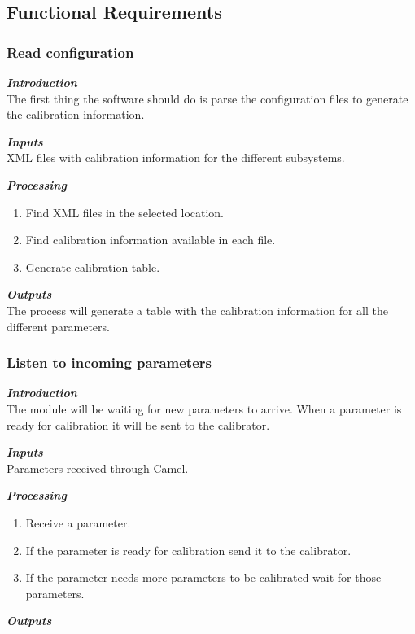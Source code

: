 \pagebreak

\subsection{Functional Requirements}

\subsubsection{Read configuration}

\textbf{\emph{Introduction}}\\
The first thing the software should do is parse the configuration files to generate the calibration information.

\textbf{\emph{Inputs}}\\

XML files with calibration information for the different subsystems.

\textbf{\emph{Processing}}\\
\begin{enumerate}
\item Find XML files in the selected location.
\item Find calibration information available in each file.
\item Generate calibration table.
\end{enumerate}

\textbf{\emph{Outputs}}\\

The process will generate a table with the calibration information for all the different parameters.




\subsubsection{Listen to incoming parameters}

\textbf{\emph{Introduction}}\\
The module will be waiting for new parameters to arrive. When a parameter is ready for calibration it will be sent to the calibrator.

\textbf{\emph{Inputs}}\\

Parameters received through Camel.

\textbf{\emph{Processing}}\\
\begin{enumerate}
\item Receive a parameter.
\item If the parameter is ready for calibration send it to the calibrator.
\item If the parameter needs more parameters to be calibrated wait for those parameters.
\end{enumerate}
\pagebreak
\textbf{\emph{Outputs}}\\

